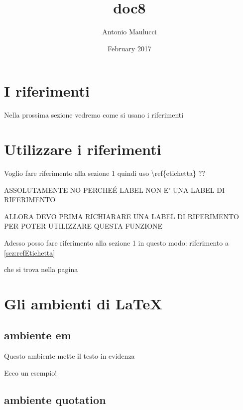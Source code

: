 \documentclass{article}
\title{doc8}
\author{Antonio Maulucci}
\date{February 2017}
\begin{document}
\maketitle

\section{I riferimenti}
\label{etichtta} %
\label{sez:refEtichetta} %

Nella prossima sezione vedremo come si usano i riferimenti

\section{Utilizzare i riferimenti}

Voglio fare riferimento alla sezione 1 quindi uso \backslash ref\{etichetta\} ??

ASSOLUTAMENTE NO PERCHEÉ LABEL NON E' UNA LABEL DI RIFERIMENTO

ALLORA DEVO PRIMA RICHIARARE UNA LABEL DI RIFERIMENTO PER POTER UTILIZZARE QUESTA FUNZIONE

Adesso posso fare riferimento alla sezione 1 in questo modo: riferimento a \ref{sez:refEtichetta}

che si trova nella pagina \pageref{sez:refEtichetta}

\newpage

\section{Gli ambienti di \LaTeX}

\subsection{ambiente em}

Questo ambiente mette il testo in evidenza

\begin{em}
Ecco un esempio!
\end{em}

\subsection{ambiente quotation}
\end{document}

